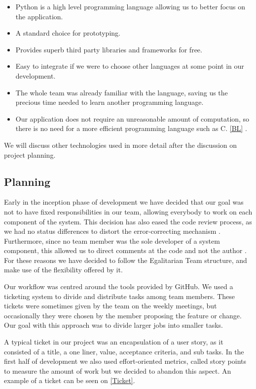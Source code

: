 \begin{itemize}
    \item Python is a high level programming language allowing us to better focus on the application.
    \item A standard choice for prototyping.
    \item Provides superb third party libraries and frameworks for free.
    \item Easy to integrate if we were to choose other languages at some point in our development.
    \item The whole team was already familiar with the language, saving us the precious time needed to learn another programming language.
    \item Our application does not require an unreasonable amount of computation, so there is no need for a more efficient programming language such as C. \ref{BL} \cite{languagescomparison}.
\end{itemize}

We will discuss other technologies used in more detail after the discussion on project planning.

\subsection{Planning}

Early in the inception phase of development we have decided that our goal was not to have fixed responsibilities in our team, allowing everybody to work on each component of the system. This decision has also eased the code review process, as we had no status differences to distort the error-correcting mechanism \cite{statusdifference}. Furthermore, since no team member was the sole developer of a system component, this allowed us to direct comments at the code and not the author \cite{howtoreview}. For these reasons we have decided to follow the Egalitarian Team structure, and make use of the flexibility offered by it.

Our workflow was centred around the tools provided by GitHub. We used a ticketing system to divide and distribute tasks among team members. These tickets were sometimes given by the team on the weekly meetings, but occasionally they were chosen by the member proposing the feature or change. Our goal with this approach was to divide larger jobs into smaller tasks.

A typical ticket in our project was an encapsulation of a user story, as it consisted of a title, a one liner, value, acceptance criteria, and sub tasks. In the first half of development we also used effort-oriented metrics, called story points to measure the amount of work but we decided to abandon this aspect. An example of a ticket can be seen on \figurename{\ref{Ticket}}.

